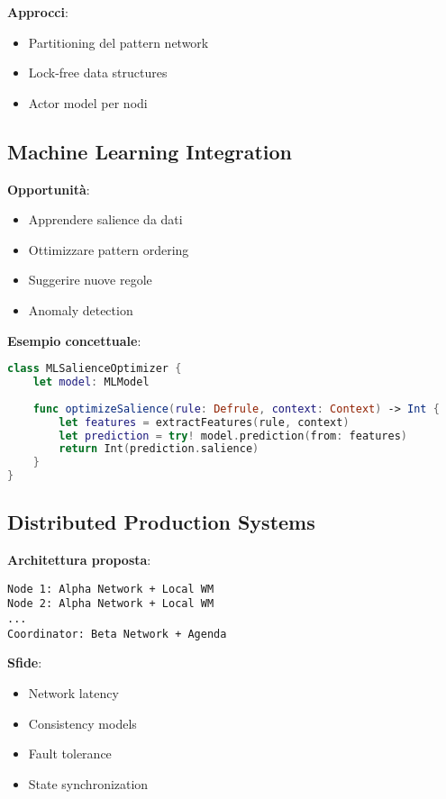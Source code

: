 \textbf{Approcci}:
\begin{itemize}
\item Partitioning del pattern network
\item Lock-free data structures
\item Actor model per nodi
\end{itemize}

\subsection{Machine Learning Integration}

\textbf{Opportunità}:
\begin{itemize}
\item Apprendere salience da dati
\item Ottimizzare pattern ordering
\item Suggerire nuove regole
\item Anomaly detection
\end{itemize}

\textbf{Esempio concettuale}:
\begin{lstlisting}[language=Swift]
class MLSalienceOptimizer {
    let model: MLModel
    
    func optimizeSalience(rule: Defrule, context: Context) -> Int {
        let features = extractFeatures(rule, context)
        let prediction = try! model.prediction(from: features)
        return Int(prediction.salience)
    }
}
\end{lstlisting}

\subsection{Distributed Production Systems}

\textbf{Architettura proposta}:

\begin{verbatim}
Node 1: Alpha Network + Local WM
Node 2: Alpha Network + Local WM
...
Coordinator: Beta Network + Agenda
\end{verbatim}

\textbf{Sfide}:
\begin{itemize}
\item Network latency
\item Consistency models
\item Fault tolerance
\item State synchronization
\end{itemize}

